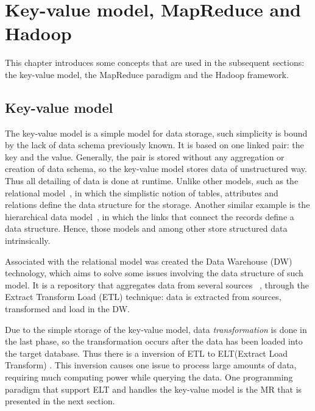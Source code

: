 \chapter{Key-value model, MapReduce and Hadoop} %
\label{cha:background}

This chapter introduces some concepts that are used in the subsequent sections:
the key-value model, the MapReduce paradigm and the Hadoop framework.

\section{Key-value model}\label{section:mapreduce}

The key-value model is a simple model for data storage, such simplicity is bound
by the lack of data schema previously known. It is based on one linked pair: the
key and the value. Generally, the pair is stored without any aggregation or
creation of data schema, so the key-value model stores data of unstructured way.
Thus all detailing of data is done at runtime. Unlike other models, such as the
relational model~\cite{codd:1970}, in which the simplistic notion of tables, attributes
and relations define the data structure for the storage. Another similar example
is the hierarchical data model~\cite{silber:2005}, in which the links that connect
the records define a data structure. Hence, those models and among other store
structured data intrinsically.

Associated with the relational model was created the Data Warehouse (DW) 
technology, which aims to solve some issues involving the data structure of such model. It is
a repository that aggregates data from several sources ~\cite{silber:2005}, through
the Extract Transform Load (ETL) 
technique: data is extracted from sources, transformed and load in the DW.

Due to the simple storage of the key-value model, data \textit{transformation}
is done in the last phase, so the transformation occurs after the data has been
loaded into the target database. Thus there is a inversion of ETL to ELT(Extract Load Transform) .
This inversion causes one issue to process large amounts of data, requiring much
computing power while querying the data. One programming paradigm that support ELT
and handles the key-value model is the MR that is presented in the next section.

